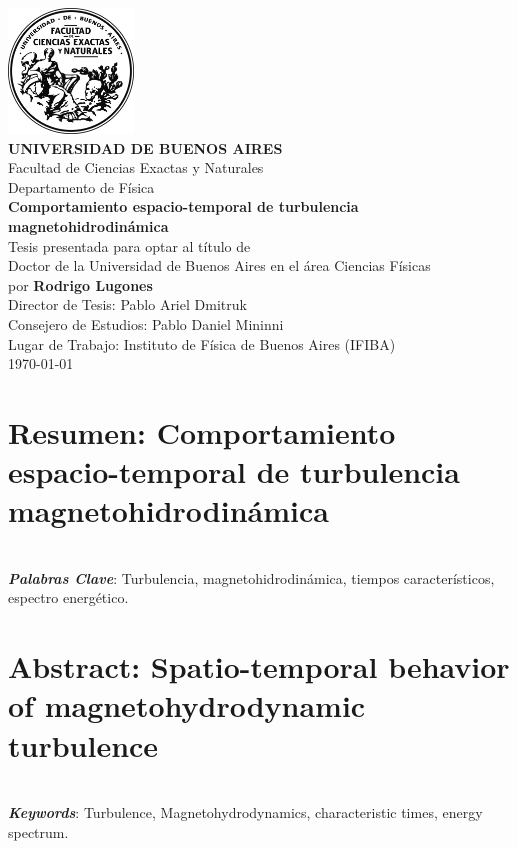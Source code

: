 \documentclass[12pt]{book}
\begin{document}
\frontmatter
\thispagestyle{empty}
\begin{center}
\large{
\includegraphics[width=0.25\textwidth]{logo.png}\vspace{1cm}\\
\textbf{UNIVERSIDAD DE BUENOS AIRES}\\
Facultad de Ciencias Exactas y Naturales\\
Departamento de Física\vspace{1.5cm}\\
\textbf{\LARGE Comportamiento espacio-temporal de turbulencia magnetohidrodinámica}
\vspace{0.5cm}\\
Tesis presentada para optar al título de \\
Doctor de la Universidad de Buenos Aires en el área Ciencias Físicas\\
por \textbf{Rodrigo Lugones} \vspace{1.5cm}\\
Director de Tesis: Pablo Ariel Dmitruk\\
Consejero de Estudios: Pablo Daniel Mininni\\
Lugar de Trabajo: Instituto de Física de Buenos Aires (IFIBA)
\vspace{1.5cm}\\
\today
}
\end{center}

\newpage

\section*{Resumen: Comportamiento espacio-temporal de turbulencia magnetohidrodinámica}
\\
\noindent\emph{\textbf{Palabras Clave}}: Turbulencia,
magnetohidrodinámica, tiempos característicos, espectro energético.

\newpage
\section*{Abstract: Spatio-temporal behavior of magnetohydrodynamic turbulence}
\\
\noindent\emph{\textbf{Keywords}}: Turbulence, Magnetohydrodynamics,
characteristic times, energy spectrum.
\end{document}
